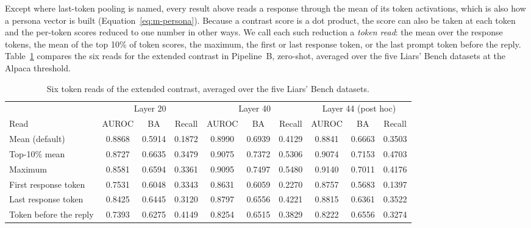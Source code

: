 Except where last-token pooling is named, every result above reads a response through the mean of its token activations, which is also how a persona vector is built (Equation~\ref{eq:m-persona}).
Because a contrast score is a dot product, the score can also be taken at each token and the per-token scores reduced to one number in other ways. %
We call each such reduction a \emph{token read}: the mean over the response tokens, the mean of the top 10\% of token scores, the maximum, the first or last response token, or the last prompt token before the reply. %
Table~\ref{tab:r-reads} compares the six reads for the extended contrast in Pipeline~B, zero-shot, averaged over the five Liars' Bench datasets at the Alpaca threshold. %

\begin{table}[t]
\centering
\footnotesize
\caption{Six token reads of the extended contrast, averaged over the five Liars' Bench datasets.}
\label{tab:r-reads}
\begin{tabular}{p{27mm}ccccccccc}
\hline
 & \multicolumn{3}{c}{Layer 20} & \multicolumn{3}{c}{Layer 40} & \multicolumn{3}{c}{Layer 44 (post hoc)} \\
Read & AUROC & BA & Recall & AUROC & BA & Recall & AUROC & BA & Recall \\
\hline
Mean (default) & 0.8868 & 0.5914 & 0.1872 & 0.8990 & 0.6939 & 0.4129 & 0.8841 & 0.6663 & 0.3503 \\
Top-10\% mean & 0.8727 & 0.6635 & 0.3479 & 0.9075 & 0.7372 & 0.5306 & 0.9074 & 0.7153 & 0.4703 \\
Maximum & 0.8581 & 0.6594 & 0.3361 & 0.9095 & 0.7497 & 0.5480 & 0.9140 & 0.7011 & 0.4176 \\
First response token & 0.7531 & 0.6048 & 0.3343 & 0.8631 & 0.6059 & 0.2270 & 0.8757 & 0.5683 & 0.1397 \\
Last response token & 0.8425 & 0.6445 & 0.3120 & 0.8797 & 0.6556 & 0.4221 & 0.8815 & 0.6361 & 0.3522 \\
Token before the reply & 0.7393 & 0.6275 & 0.4149 & 0.8254 & 0.6515 & 0.3829 & 0.8222 & 0.6556 & 0.3274 \\
\hline
\end{tabular}
\end{table}

